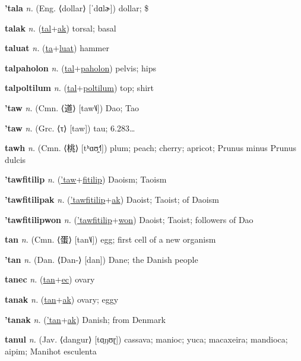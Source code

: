 \textbf{\hypertarget{'tala}{'tala}} \textit{n.} (Eng. ⟨dollar⟩ [ˈdɑlɚ])
dollar; \$

\textbf{\hypertarget{talak}{talak}} \textit{n.} (\hyperlink{tal}{tal}+\allowbreak \hyperlink{ak}{ak})
torsal; basal

\textbf{\hypertarget{taluat}{taluat}} \textit{n.} (\hyperlink{ta}{ta}+\allowbreak \hyperlink{luat}{luat})
hammer

\textbf{\hypertarget{talpaholon}{talpaholon}} \textit{n.} (\hyperlink{tal}{tal}+\allowbreak \hyperlink{paholon}{paholon})
pelvis; hips

\textbf{\hypertarget{talpoltilum}{talpoltilum}} \textit{n.} (\hyperlink{tal}{tal}+\allowbreak \hyperlink{poltilum}{poltilum})
top; shirt

\textbf{\hypertarget{'taw}{'taw}} \textit{n.} (Cmn. ⟨{\chinese{}道}⟩ [taw˥˩])
Dao; Tao

\textbf{\hypertarget{'taw}{'taw}} \textit{n.} (Grc. ⟨τ⟩ [taw])
tau; 6.283…

\textbf{\hypertarget{tawh}{tawh}} \textit{n.} (Cmn. ⟨{\chinese{}桃}⟩ [tʰɑʊ̯˧˥])
plum; peach; cherry; apricot; Prunus minus Prunus dulcis

\textbf{\hypertarget{'tawfitilip}{'tawfitilip}} \textit{n.} (\hyperlink{'taw}{'taw}+\allowbreak \hyperlink{fitilip}{fitilip})
Daoism; Taoism

\textbf{\hypertarget{'tawfitilipak}{'tawfitilipak}} \textit{n.} (\hyperlink{'tawfitilip}{'tawfitilip}+\allowbreak \hyperlink{ak}{ak})
Daoist; Taoist; of Daoism

\textbf{\hypertarget{'tawfitilipwon}{'tawfitilipwon}} \textit{n.} (\hyperlink{'tawfitilip}{'tawfitilip}+\allowbreak \hyperlink{won}{won})
Daoist; Taoist; followers of Dao

\textbf{\hypertarget{tan}{tan}} \textit{n.} (Cmn. ⟨{\chinese{}蛋}⟩ [tan˥˩])
egg; first cell of a new organism

\textbf{\hypertarget{'tan}{'tan}} \textit{n.} (Dan. ⟨Dan-⟩ [dan])
Dane; the Danish people

\textbf{\hypertarget{tanec}{tanec}} \textit{n.} (\hyperlink{tan}{tan}+\allowbreak \hyperlink{ec}{ec})
ovary

\textbf{\hypertarget{tanak}{tanak}} \textit{n.} (\hyperlink{tan}{tan}+\allowbreak \hyperlink{ak}{ak})
ovary; eggy

\textbf{\hypertarget{'tanak}{'tanak}} \textit{n.} (\hyperlink{'tan}{'tan}+\allowbreak \hyperlink{ak}{ak})
Danish; from Denmark

\textbf{\hypertarget{tanul}{tanul}} \textit{n.} (Jav. ⟨dangur⟩ [tɑ̤ŋʊɽ])
cassava; manioc; yuca; macaxeira; mandioca; aipim; Manihot esculenta

